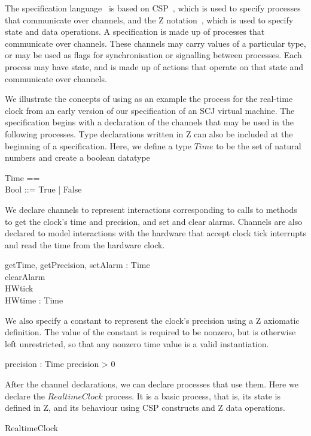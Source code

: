 The \Circus{} specification language~\cite{oliveira2009} is based on
CSP~\cite{roscoe2011}, which is used to specify processes that
communicate over channels, and the Z notation~\cite{woodcock1996},
which is used to specify state and data operations.
A \Circus{} specification is made up of processes that communicate
over channels.
These channels may carry values of a particular type, or may be used
as flags for synchronisation or signalling between processes.
Each process may have state, and is made up of actions that operate on
that state and communicate over channels.

We illustrate the concepts of \Circus{} using as an example the
process for the real-time clock from an early version of our
specification of an SCJ virtual machine.
The specification begins with a declaration of the channels that may
be used in the following processes.
Type declarations written in Z can also be included at the beginning
of a \Circus{} specification.
Here, we define a type $Time$ to be the set of natural numbers and
create a boolean datatype
%
\begin{zed}
  Time == \nat \\
  Bool ::= True | False
\end{zed}
%
We declare channels to represent interactions corresponding to calls
to methods to get the clock's time and precision, and set and clear
alarms.
Channels are also declared to model interactions with the hardware
that accept clock tick interrupts and read the time from the hardware
clock.
%
\begin{circus}
  \circchannel getTime, getPrecision, setAlarm : Time \\
  \circchannel clearAlarm \\
  \circchannel HWtick \\
  \circchannel HWtime : Time
\end{circus}
%
We also specify a constant to represent the clock's precision using a
Z axiomatic definition.
The value of the constant is required to be nonzero, but is otherwise
left unrestricted, so that any nonzero time value is a valid
instantiation.
%
\begin{axdef}
  precision : Time \where precision > 0
\end{axdef}
%
After the channel declarations, we can declare processes that use
them.
Here we declare the $RealtimeClock$ process.
It is a basic process, that is, its state is defined in Z, and its
behaviour using CSP constructs and Z data operations.
%
\begin{circus}
  \circprocess RealtimeClock \circdef \circbegin
\end{circus}
